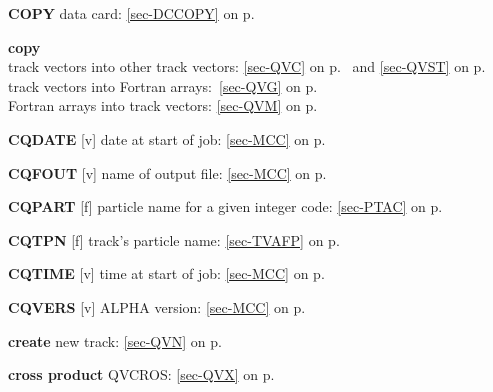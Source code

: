  \item{\bf COPY    }data card: \ref{sec-DCCOPY} on p.~\pageref{sec-DCCOPY}\\
 \item{\bf copy    }\\
 \subitem track vectors into other track vectors:
 \ref{sec-QVC} on p.~\pageref{sec-QVC} and \ref{sec-QVST} on p.~\pageref{sec-QVST}\\
 \subitem track vectors into Fortran arrays:~\ref{sec-QVG} on p.~\pageref{sec-QVG}\\
 \subitem Fortran arrays into track vectors: \ref{sec-QVM} on p.~\pageref{sec-QVM}\\
 \item{\bf CQDATE  }[v] date at start of job: \ref{sec-MCC} on p.~\pageref{sec-MCC}\\
 \item{\bf CQFOUT  }[v] name of output file: \ref{sec-MCC} on p.~\pageref{sec-MCC}\\
 \item{\bf CQPART  }[f] particle name for a given integer code:
 \ref{sec-PTAC} on p.~\pageref{sec-PTAC}\\
 \item{\bf CQTPN   }[f] track's particle name: \ref{sec-TVAFP} on p.~\pageref{sec-TVAFP}\\
 \item{\bf CQTIME  }[v] time at start of job: \ref{sec-MCC} on p.~\pageref{sec-MCC}\\
 \item{\bf CQVERS  }[v] ALPHA version: \ref{sec-MCC} on p.~\pageref{sec-MCC}\\
 \item{\bf create  }new track: \ref{sec-QVN} on p.~\pageref{sec-QVN}\\
 \item{\bf cross product   }QVCROS: \ref{sec-QVX} on p.~\pageref{sec-QVX}
 
